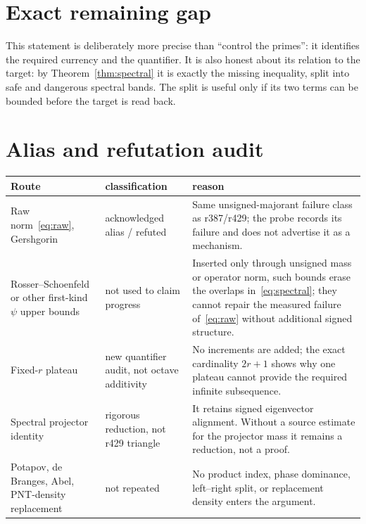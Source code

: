 \documentclass[11pt]{article}
\theoremstyle{remark}
\begin{document}
\section{Exact remaining gap}

\noindent{}

\medskip
This statement is deliberately more precise than ``control the
primes'': it identifies the required currency and the quantifier.
It is also honest about its relation to the target: by
Theorem~\ref{thm:spectral} it is exactly the missing inequality,
split into safe and dangerous spectral bands.  The split is useful
only if its two terms can be bounded before the target is read back.

\section{Alias and refutation audit}

\begin{center}
\small
\begin{tabular}{@{}p{3.4cm}p{3.0cm}p{7.0cm}@{}}
\toprule
Route & classification & reason\\
\midrule
Raw norm~\eqref{eq:raw}, Gershgorin &
acknowledged alias / refuted &
Same unsigned-majorant failure class as r387/r429; the probe records
its failure and does not advertise it as a mechanism.\\
Rosser--Schoenfeld or other first-kind $\psi$ upper bounds &
not used to claim progress &
Inserted only through unsigned mass or operator norm, such bounds
erase the overlaps in~\eqref{eq:spectral}; they cannot repair the
measured failure of~\eqref{eq:raw} without additional signed
structure.\\
Fixed-$r$ plateau &
new quantifier audit, not octave additivity &
No increments are added; the exact cardinality $2r+1$ shows why one
plateau cannot provide the required infinite subsequence.\\
Spectral projector identity &
rigorous reduction, not r429 triangle &
It retains signed eigenvector alignment.  Without a source estimate
for the projector mass it remains a reduction, not a proof.\\
Potapov, de Branges, Abel, PNT-density replacement &
not repeated &
No product index, phase dominance, left--right split, or replacement
density enters the argument.\\
\bottomrule
\end{tabular}
\end{center}
\end{document}
